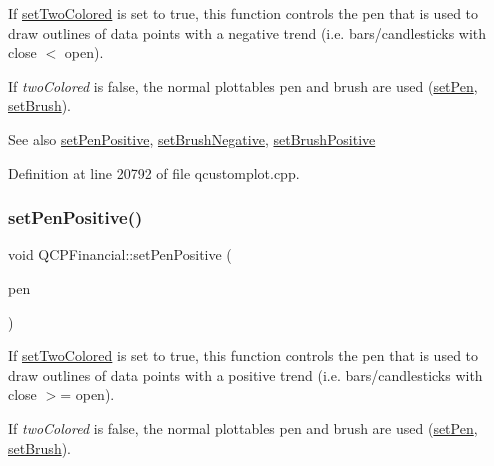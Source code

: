 If \hyperlink{class_q_c_p_financial_a138e44aac160a17a9676652e240c5f08}{set\+Two\+Colored} is set to true, this function controls the pen that is used to draw outlines of data points with a negative trend (i.\+e. bars/candlesticks with close $<$ open).

If {\itshape two\+Colored} is false, the normal plottable\textquotesingle{}s pen and brush are used (\hyperlink{class_q_c_p_abstract_plottable_ab74b09ae4c0e7e13142fe4b5bf46cac7}{set\+Pen}, \hyperlink{class_q_c_p_abstract_plottable_a7a4b92144dca6453a1f0f210e27edc74}{set\+Brush}).

\begin{DoxySeeAlso}{See also}
\hyperlink{class_q_c_p_financial_ac58aa3adc7a35aab0088764b840683e5}{set\+Pen\+Positive}, \hyperlink{class_q_c_p_financial_a8bbdd87629f9144b3ef51af660c0961a}{set\+Brush\+Negative}, \hyperlink{class_q_c_p_financial_a5ebff2b1764efd07cc44942e67821829}{set\+Brush\+Positive} 
\end{DoxySeeAlso}


Definition at line 20792 of file qcustomplot.\+cpp.

\mbox{\label{class_q_c_p_financial_ac58aa3adc7a35aab0088764b840683e5}} 
\subsubsection{\texorpdfstring{set\+Pen\+Positive()}{setPenPositive()}}
{\footnotesize\ttfamily void Q\+C\+P\+Financial\+::set\+Pen\+Positive (\begin{DoxyParamCaption}\item[{const Q\+Pen \&}]{pen }\end{DoxyParamCaption})}

If \hyperlink{class_q_c_p_financial_a138e44aac160a17a9676652e240c5f08}{set\+Two\+Colored} is set to true, this function controls the pen that is used to draw outlines of data points with a positive trend (i.\+e. bars/candlesticks with close $>$= open).

If {\itshape two\+Colored} is false, the normal plottable\textquotesingle{}s pen and brush are used (\hyperlink{class_q_c_p_abstract_plottable_ab74b09ae4c0e7e13142fe4b5bf46cac7}{set\+Pen}, \hyperlink{class_q_c_p_abstract_plottable_a7a4b92144dca6453a1f0f210e27edc74}{set\+Brush}).

